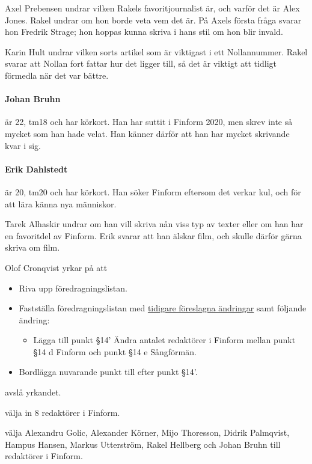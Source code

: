 \documentclass[hidelinks]{sektionsmote}
\begin{document}
Axel Prebensen undrar vilken Rakels favoritjournalist är, och varför det är Alex Jones.
Rakel undrar om hon borde veta vem det är.
På Axels första fråga svarar hon Fredrik Strage; hon hoppas kunna skriva i hans stil om hon blir invald.

Karin Hult undrar vilken sorts artikel som är viktigast i ett Nollannummer.
Rakel svarar att Nollan fort fattar hur det ligger till, så det är viktigt att tidligt förmedla när det var bättre.

\paragraph{Johan Bruhn} är 22, tm18 och har körkort.
Han har suttit i Finform 2020, men skrev inte så mycket som han hade velat.
Han känner därför att han har mycket skrivande kvar i sig.

\paragraph{Erik Dahlstedt} är 20, tm20 och har körkort.
Han söker Finform eftersom det verkar kul, och för att lära känna nya människor.

Tarek Alhaskir undrar om han vill skriva nån viss typ av texter eller om han har en favoritdel av Finform.
Erik svarar att han älskar film, och skulle därför gärna skriva om film.

\begin{ofraga}
  Olof Cronqvist yrkar på att
  \begin{itemize}
    \item Riva upp föredragningslistan.
    \item Fastställa föredragningslistan med \hyperref[beslut:foredragningslista-2]{tidigare föreslagna ändringar} samt följande ändring:
    \begin{itemize}
      \item Lägga till punkt §14' Ändra antalet redaktörer i Finform mellan punkt §14 d Finform och punkt §14 e Sångförmän.
    \end{itemize}
    \item Bordlägga nuvarande punkt till efter punkt §14'.
  \end{itemize}
  \begin{beslut}
    \item avslå yrkandet.
  \end{beslut}
\end{ofraga}

\begin{beslut}
  \item välja in 8 redaktörer i Finform.
  \item välja Alexandru Golic, Alexander Körner, Mijo Thoresson, Didrik Palmqvist, Hampus Hansen, Markus Utterström, Rakel Hellberg och Johan Bruhn till redaktörer i Finform.
\end{beslut}
\end{document}

